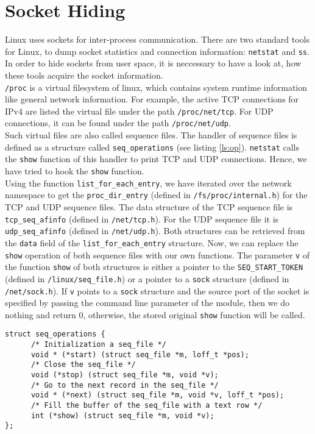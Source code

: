 \section{Socket Hiding}
Linux uses sockets for inter-process communication. There are two standard tools for Linux, to dump socket statistics and connection information: \texttt{netstat} and \texttt{ss}. In order to hide sockets from user space, it is neccessary to have a look at, how these tools acquire the socket information. \\
\verb+/proc+ is a virtual filesystem of linux, which contains system runtime information like general network information. For example, the active TCP connections for IPv4 are listed the virtual file under the path \verb+/proc/net/tcp+. For UDP connections, it can be found under the path \verb+/proc/net/udp+.\\
Such virtual files are also called sequence files. The handler of sequence files 
is defined as a structure called \verb+seq_operations+ (see listing 
\ref{ls:op}). \verb+netstat+ calls the \verb+show+ function of this handler to print TCP and UDP 
connections. Hence, we have tried to hook the \verb+show+ function.\\
Using the function \verb+list_for_each_entry+, we have iterated over the network 
namespace to get the \verb+proc_dir_entry+ (defined in 
\verb+/fs/proc/internal.h+) for the TCP and UDP sequence files. The data 
structure of the TCP sequence file is \verb+tcp_seq_afinfo+ (defined in 
\verb+/net/tcp.h+). For the UDP sequence file it is \verb+udp_seq_afinfo+ 
(defined in \verb+/net/udp.h+). Both structures can be retrieved from the 
\verb+data+ field of the \verb+list_for_each_entry+ structure. Now, we can 
replace the \verb+show+ operation of both sequence files with our own 
functions. The parameter \verb+v+ of the function \verb+show+ of both 
structures is either a pointer to the \verb+SEQ_START_TOKEN+ (defined in 
\verb+/linux/seq_file.h+) or a pointer to a \verb+sock+ structure (defined in 
\verb+/net/sock.h+). If \verb+v+ points to a \verb+sock+ structure and the 
source port of the socket is specified by passing the command line parameter of 
the module, then we do nothing and return 0, otherwise, the stored original 
\verb+show+ function will be called.
\lstset{escapechar=,style=customc}
\begin{lstlisting}[captionpos=b, caption={The \texttt{seq\_operations} structure defined in \texttt{/linux/seq\_file.h}}, label={ls:op}]
struct seq_operations {
      /* Initialization a seq_file */		
      void * (*start) (struct seq_file *m, loff_t *pos);
      /* Close the seq_file */
      void (*stop) (struct seq_file *m, void *v);
      /* Go to the next record in the seq_file */
      void * (*next) (struct seq_file *m, void *v, loff_t *pos);
      /* Fill the buffer of the seq_file with a text row */
      int (*show) (struct seq_file *m, void *v);
};
\end{lstlisting}
